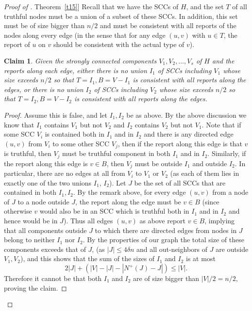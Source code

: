 \documentclass[11pt]{article}
\numberwithin{equation}{section}
\newtheorem{claim}[theorem]{Claim}
\theoremstyle{definition}
\theoremstyle{plain}
\newcommand{\expref}[2]{\hyperref[#2]{#1~\ref{#2}}}
\begin{document}
\begin{proof}[Proof of \expref{Theorem}{t15}]
Recall that we have the SCCs of $H$, and the set $T$ of all truthful
nodes must be a union of a subset of these SCCs.
In addition, this set must be of size bigger than $n/2$ and must be
consistent with all reports of the nodes along every edge (in
the sense that for any edge $(u,v)$ with $u \in T$, the report of
$u$ on $v$ should be consistent with the actual type of $v$).

\begin{claim}
\label{c28}
Given the strongly connected components $V_1,V_2, \ldots ,V_s$
of $H$ and the reports along each edge, either there is no 
union $I_1$ of SCCs including 
$V_1$ whose size exceeds $n/2$ so that $T=I_1,
B=V-I_1$ is
consistent with all reports along the edges, or there is no union
$I_2$ of SCCs including $V_2$ whose size exceeds $n/2$ so that 
$T=I_2,B=V-I_2$ is consistent with all reports along the edges. 
\end{claim}
\vspace{0.1cm}

\begin{proof}
Assume this is false, and let $I_1, I_2$ be as above.
By the above discussion we know that $I_1$ contains
$V_1$ but not $V_2$ and $I_2$ contains $V_2$ but not $V_1$.
Note that if some SCC $V_i$ is contained both in $I_1$ and in $I_2$ 
and there is any directed edge $(u,v)$ from $V_i$ to some other SCC
$V_j$, then if the report along this edge is that $v$ is truthful,
then $V_j$ must be  truthful  component in both $I_1$ and in $I_2$.
Similarly, if the report along this edge is $v \in B$, then $V_j$
must be outside $I_1$ and outside $I_2$. In particular, there are
no edges at all from $V_i$  to  $V_1$ or $V_2$ (as each of them
lies in exactly one of the two unions $I_1$, $I_2$). Let $J$ be the
set of all SCCs that are contained in both $I_1,I_2$. By the remark
above, for every edge $(u,v)$ from a node of $J$ to a node outside $J$,
the report along the edge must be  $v \in B$ (since otherwise $v$
would also be in an SCC which is truthful both in $I_1$ and in
$I_2$ and hence would be in $J$). Thus all edges $(u,v)$ as above
report $v \in B$, implying that all components outside $J$ 
to which there are
directed edges from nodes in $J$  belong to neither $I_1$ nor
$I_2$. By the properties of our graph the total size of these
components exceeds that of $J$, (as $|J| \leq 4 \delta n$ and all
out-neighbors of $J$ are outside $V_1,V_2$), and this shows that
the sum of the sizes of $I_1$ and $I_2$ is at  most
$$
2|J| +(|V|-|J|-|N^+(J)-J|) \leq |V|.
$$
Therefore  it cannot be that both $I_1$ and $I_2$ are of size bigger
than $|V|/2=n/2$, proving the claim.
\end{proof}


\end{proof}
\end{document}
